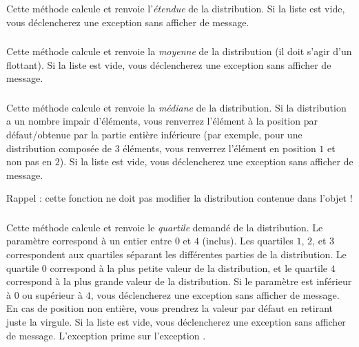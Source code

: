 \noindent Cette méthode calcule et renvoie l'\textit{étendue} de la distribution.
Si la liste est vide, vous déclencherez une exception  sans afficher de message.



\subsubsection*{}

\noindent Cette méthode calcule et renvoie la \textit{moyenne} de la distribution (il doit s'agir d'un flottant).
Si la liste est vide, vous déclencherez une exception  sans afficher de message.


\subsubsection*{}

\noindent Cette méthode calcule et renvoie la \textit{médiane} de la distribution.
Si la distribution a un nombre impair d'éléments, vous renverrez l'élément à la position par défaut/obtenue par la partie entière inférieure (par exemple, pour une distribution composée de $ 3 $ éléments, vous renverrez l'élément en position $ 1 $ et non pas en $ 2 $).
Si la liste est vide, vous déclencherez une exception  sans afficher de message.

\medskip

\noindent Rappel : cette fonction ne doit pas modifier la distribution contenue dans l'objet !


\subsubsection*{}

\noindent Cette méthode calcule et renvoie le \textit{quartile} demandé de la distribution.
Le paramètre  correspond à un entier entre $ 0 $ et $ 4 $ (inclus).
Les quartiles $ 1 $, $ 2 $, et $ 3 $ correspondent aux quartiles séparant les différentes parties de la distribution.
Le quartile $ 0 $ correspond à la plus petite valeur de la distribution, et le quartile $ 4 $ correspond à la plus grande valeur de la distribution.
Si le paramètre  est inférieur à $ 0 $ ou supérieur à $ 4 $, vous déclencherez une exception  sans afficher de message.
En cas de position non entière, vous prendrez la valeur par défaut en retirant juste la virgule.
Si la liste est vide, vous déclencherez une exception  sans afficher de message.
L'exception  prime sur l'exception .

